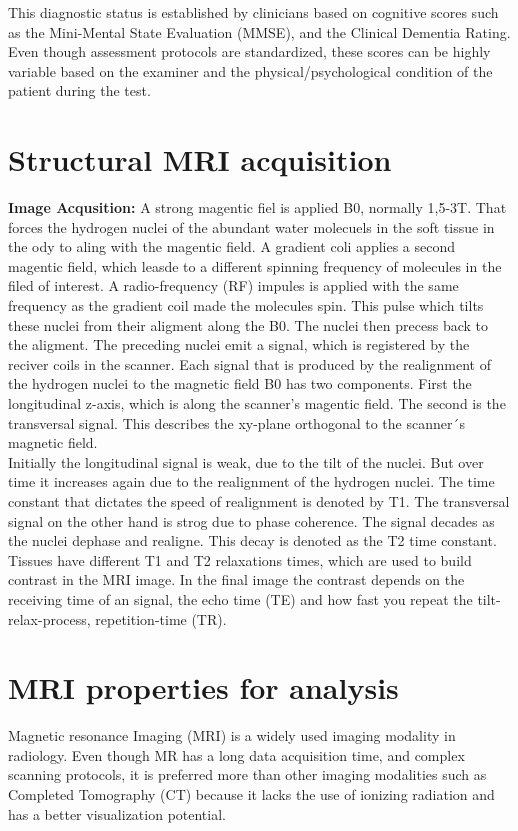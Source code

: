 This diagnostic status is established by clinicians based on cognitive scores such as the Mini-Mental State Evaluation (MMSE),
and the Clinical Dementia Rating. Even though assessment protocols are standardized, these scores can be highly variable based on the examiner and the physical/psychological condition of the patient during the test.

\section{Structural MRI acquisition}
\label{sec: Structural MRI acqusition}
\textbf{Image Acqusition:}
A strong magentic fiel is applied B0, normally 1,5-3T. That forces the hydrogen nuclei of the abundant water molecuels in the soft tissue in the ody to aling with the magentic field. 
A gradient coli applies a second magentic field, which leasde to a different spinning frequency of molecules in the filed of interest. A radio-frequency (RF) impules is applied with the same 
frequency as the gradient coil made the molecules spin. This pulse which tilts these nuclei from their aligment along the B0. The nuclei then precess back to the aligment. The 
preceding nuclei emit a signal, which is registered by the reciver coils in the scanner. 
Each signal that is produced by the realignment of the hydrogen nuclei to the magnetic field B0 has two components. First the longitudinal z-axis, which is along the scanner's magentic field. 
The second is the transversal signal. This describes the xy-plane orthogonal to the scanner´s magnetic field.
\\

Initially the longitudinal signal is weak, due to the tilt of the nuclei. But over time it increases again due to the realignment of the hydrogen nuclei. The time constant 
that dictates the speed of realignment is denoted by T1. The transversal signal on the other hand is strog due to phase coherence. The signal decades as the nuclei dephase and realigne. 
This decay is denoted as the T2 time constant.\\

Tissues have different T1 and T2 relaxations times, which are used to build contrast in the MRI image. In the final image the contrast depends on the receiving time of an signal, 
the echo time (TE) and how fast you repeat the tilt-relax-process, repetition-time (TR).





\section{MRI properties for analysis}
\label{sec: MRI propperties for analysis}
Magnetic resonance Imaging (MRI) is a widely used imaging modality in radiology.
Even though MR has a long data acquisition time, and complex scanning protocols, it is preferred more than other imaging modalities such as Completed Tomography (CT)
because it lacks the use of ionizing radiation and has a better visualization potential. 

